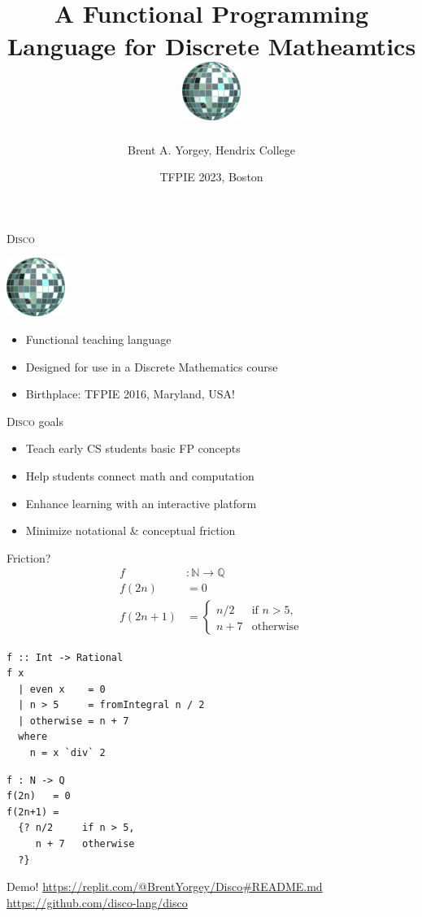 \documentclass[fleqn,xcolor={usenames,dvipsnames,svgnames,table},12pt,aspectratio=169]{beamer}
\title{\disco \\ \small{A Functional Programming Language for Discrete
  Matheamtics} \\ \bigskip \includegraphics[width=0.75in]{logo.png}}
\date{TFPIE 2023, Boston}
\author{Brent A. Yorgey, Hendrix College}
\newenvironment{xframe}[1][]
  {\begin{frame}[fragile,environment=xframe,#1]}
  {\end{frame}}
\newcommand{\disco}{\textsc{Disco}\xspace}
\newcommand{\N}{\mathbb{N}}
\newcommand{\Q}{\mathbb{Q}}
\begin{document}
\maketitle

\begin{frame}{\disco}
  \begin{center}\includegraphics[width=0.75in]{logo.png}\end{center}

  \begin{itemize}
  \item Functional teaching language
  \item Designed for use in a Discrete Mathematics course
  \item Birthplace: TFPIE 2016, Maryland, USA!
  \end{itemize}
\end{frame}

\begin{frame}{\disco goals}
  \begin{itemize}
  \item Teach early CS students basic FP concepts
  \item Help students connect math and computation
  \item Enhance learning with an interactive platform
  \item Minimize notational \& conceptual friction
  \end{itemize}
\end{frame}

\begin{xframe}{Friction?}
  \begin{align*}
    f &: \N \to \Q \\
    f(2n)   &= 0 \\
    f(2n+1) &= \begin{cases} n/2 & \text{if } n > 5, \\
      n + 7 & \text{otherwise}
      \end{cases}
  \end{align*}

  \begin{overprint}

    \begin{center}
  \begin{verbatim}
f :: Int -> Rational
f x
  | even x    = 0
  | n > 5     = fromIntegral n / 2
  | otherwise = n + 7
  where
    n = x `div` 2
  \end{verbatim}
    \end{center}

  \begin{verbatim}
f : N -> Q
f(2n)   = 0
f(2n+1) =
  {? n/2     if n > 5,
     n + 7   otherwise
  ?}
  \end{verbatim}
  \end{overprint}
\end{xframe}

\begin{frame}{Demo!}
  \url{https://replit.com/@BrentYorgey/Disco#README.md}
  \url{https://github.com/disco-lang/disco}
\end{frame}
\end{document}
